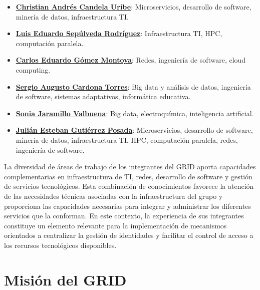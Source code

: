 \begin{itemize}
	\item \href{https://scienti.minciencias.gov.co/cvlac/visualizador/generarCurriculoCv.do?cod_rh=0000210897}{\textbf{Christian Andrés Candela Uribe}}: Microservicios, desarrollo de software, minería de datos, infraestructura \ac{TI}.
	\item \href{https://scienti.minciencias.gov.co/cvlac/visualizador/generarCurriculoCv.do?cod_rh=0001383939}{\textbf{Luis Eduardo Sepúlveda Rodríguez}}: Infraestructura \ac{TI}, \ac{HPC}, computación paralela.
	\item \href{https://scienti.minciencias.gov.co/cvlac/visualizador/generarCurriculoCv.do?cod_rh=0001343801}{\textbf{Carlos Eduardo Gómez Montoya}}: Redes, ingeniería de software, cloud computing.
	\item \href{https://scienti.minciencias.gov.co/cvlac/visualizador/generarCurriculoCv.do?cod_rh=0001398775}{\textbf{Sergio Augusto Cardona Torres}}: Big data y análisis de datos, ingeniería de software, sistemas adaptativos, informática educativa.
	\item \href{https://scienti.minciencias.gov.co/cvlac/visualizador/generarCurriculoCv.do?cod_rh=0000193550}{\textbf{Sonia Jaramillo Valbuena}}: Big data, electroquímica, inteligencia artificial.
	\item \href{https://scienti.minciencias.gov.co/cvlac/visualizador/generarCurriculoCv.do?cod_rh=0000283495}{\textbf{Julián Esteban Gutiérrez Posada}}: Microservicios, desarrollo de software, minería de datos, infraestructura \ac{TI}, \ac{HPC}, computación paralela, redes, ingeniería de software.
\end{itemize}

La diversidad de áreas de trabajo de los integrantes del \ac{GRID} aporta capacidades complementarias en infraestructura de \ac{TI}, redes, desarrollo de software y gestión de servicios tecnológicos. Esta combinación de conocimientos favorece la atención de las necesidades técnicas asociadas con la infraestructura del grupo y proporciona las capacidades necesarias para integrar y administrar los diferentes servicios que la conforman. En este contexto, la experiencia de sus integrantes constituye un elemento relevante para la implementación de mecanismos orientados a centralizar la gestión de identidades y facilitar el control de acceso a los recursos tecnológicos disponibles.

\section{Misión del \texorpdfstring{\ac{GRID}}{GRID}}

